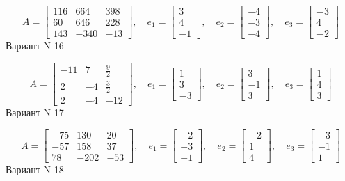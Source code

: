 \documentclass[11pt]{report}
\begin{document}
$$A = \left[\begin{matrix}116 & 664 & 398\\60 & 646 & 228\\143 & -340 & -13\end{matrix}\right],\quad e_1 = \left[\begin{matrix}3\\4\\-1\end{matrix}\right],\quad e_2 = \left[\begin{matrix}-4\\-3\\-4\end{matrix}\right],\quad e_3 = \left[\begin{matrix}-3\\4\\-2\end{matrix}\right]$$Вариант N 16

$$A = \left[\begin{matrix}-11 & 7 & \frac{9}{2}\\2 & -4 & \frac{3}{2}\\2 & -4 & -12\end{matrix}\right],\quad e_1 = \left[\begin{matrix}1\\3\\-3\end{matrix}\right],\quad e_2 = \left[\begin{matrix}3\\-1\\3\end{matrix}\right],\quad e_3 = \left[\begin{matrix}1\\4\\3\end{matrix}\right]$$Вариант N 17

$$A = \left[\begin{matrix}-75 & 130 & 20\\-57 & 158 & 37\\78 & -202 & -53\end{matrix}\right],\quad e_1 = \left[\begin{matrix}-2\\-3\\-1\end{matrix}\right],\quad e_2 = \left[\begin{matrix}-2\\1\\4\end{matrix}\right],\quad e_3 = \left[\begin{matrix}-3\\-1\\1\end{matrix}\right]$$Вариант N 18
\end{document}
